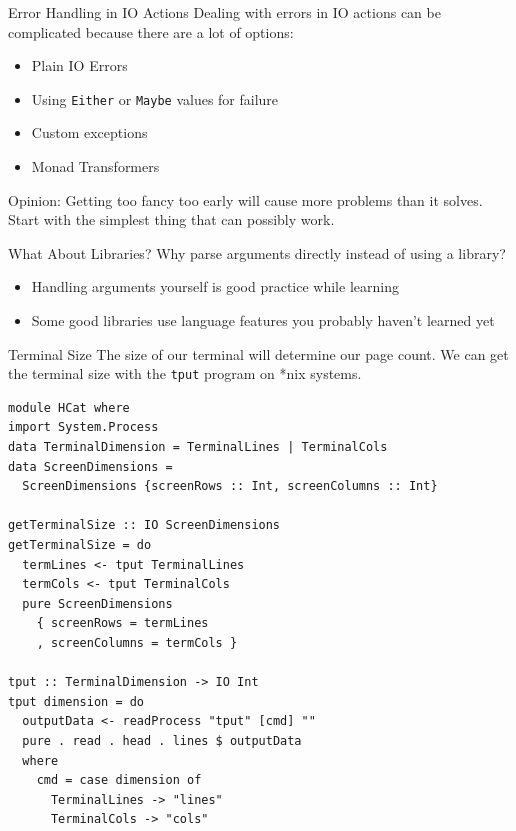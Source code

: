 \documentclass[10pt, presentation, colorlinks]{beamer}
\begin{document}
\begin{frame}[label={sec:org1e3080a},fragile]{Error Handling in IO Actions}
 Dealing with errors in IO actions can be complicated because there are a lot of options:

\bigskip
\pause

\begin{itemize}
\item Plain IO Errors
\item Using \texttt{Either} or \texttt{Maybe} values for failure
\item Custom exceptions
\item Monad Transformers
\end{itemize}

\bigskip
\pause

\alert{Opinion}: Getting too fancy too early will cause more problems than it solves. Start with the simplest thing that can possibly work.
\end{frame}

\begin{frame}[label={sec:org4aa4dfe}]{What About Libraries?}
Why parse arguments directly instead of using a library?

\bigskip
\pause

\begin{itemize}
\item Handling arguments yourself is good practice while learning
\item Some good libraries use language features you probably haven't learned yet
\end{itemize}
\end{frame}

\begin{frame}[label={sec:org2b6da65},fragile]{Terminal Size}
 The size of our terminal will determine our page count. We can get the terminal size with the \alert{\texttt{tput}} program on *nix systems.

\pause

\begin{verbatim}
module HCat where
import System.Process
data TerminalDimension = TerminalLines | TerminalCols
data ScreenDimensions =
  ScreenDimensions {screenRows :: Int, screenColumns :: Int}

getTerminalSize :: IO ScreenDimensions
getTerminalSize = do
  termLines <- tput TerminalLines
  termCols <- tput TerminalCols
  pure ScreenDimensions
    { screenRows = termLines
    , screenColumns = termCols }

tput :: TerminalDimension -> IO Int
tput dimension = do
  outputData <- readProcess "tput" [cmd] ""
  pure . read . head . lines $ outputData
  where
    cmd = case dimension of
      TerminalLines -> "lines"
      TerminalCols -> "cols"
\end{verbatim}
\end{frame}
\end{document}
